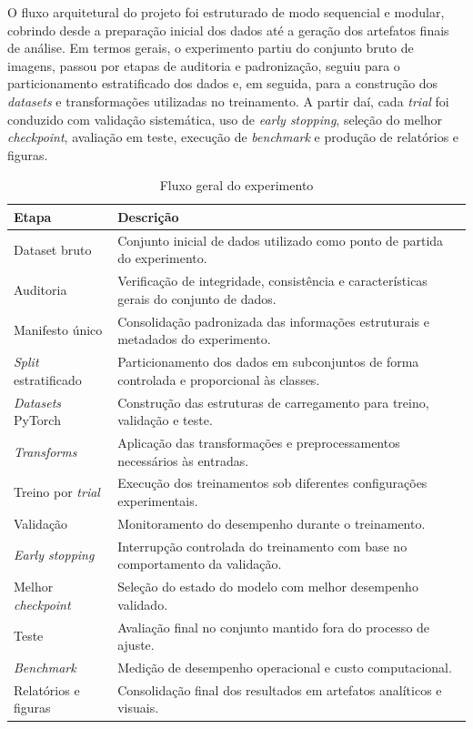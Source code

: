 \documentclass[tcc,capa]{texufpel}
\begin{document}
O fluxo arquitetural do projeto foi estruturado de modo sequencial e modular, cobrindo desde a preparação inicial dos dados até a geração dos artefatos finais de análise. Em termos gerais, o experimento partiu do conjunto bruto de imagens, passou por etapas de auditoria e padronização, seguiu para o particionamento estratificado dos dados e, em seguida, para a construção dos \textit{datasets} e transformações utilizadas no treinamento. A partir daí, cada \textit{trial} foi conduzido com validação sistemática, uso de \textit{early stopping}, seleção do melhor \textit{checkpoint}, avaliação em teste, execução de \textit{benchmark} e produção de relatórios e figuras.

\begin{table}[htbp]
	\centering
	\caption{Fluxo geral do experimento}
	\label{tab:fluxo_geral_experimento}
	\begin{tabular}{|p{4.2cm}|p{9.2cm}|}
		\hline
		\textbf{Etapa} & \textbf{Descrição} \\ \hline
		Dataset bruto & Conjunto inicial de dados utilizado como ponto de partida do experimento. \\ \hline
		Auditoria & Verificação de integridade, consistência e características gerais do conjunto de dados. \\ \hline
		Manifesto único & Consolidação padronizada das informações estruturais e metadados do experimento. \\ \hline
		\textit{Split} estratificado & Particionamento dos dados em subconjuntos de forma controlada e proporcional às classes. \\ \hline
		\textit{Datasets} PyTorch & Construção das estruturas de carregamento para treino, validação e teste. \\ \hline
		\textit{Transforms} & Aplicação das transformações e preprocessamentos necessários às entradas. \\ \hline
		Treino por \textit{trial} & Execução dos treinamentos sob diferentes configurações experimentais. \\ \hline
		Validação & Monitoramento do desempenho durante o treinamento. \\ \hline
		\textit{Early stopping} & Interrupção controlada do treinamento com base no comportamento da validação. \\ \hline
		Melhor \textit{checkpoint} & Seleção do estado do modelo com melhor desempenho validado. \\ \hline
		Teste & Avaliação final no conjunto mantido fora do processo de ajuste. \\ \hline
		\textit{Benchmark} & Medição de desempenho operacional e custo computacional. \\ \hline
		Relatórios e figuras & Consolidação final dos resultados em artefatos analíticos e visuais. \\ \hline
	\end{tabular}
\end{table}
\end{document}
